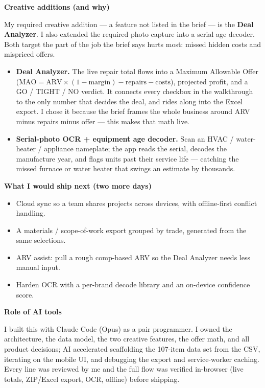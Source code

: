 \documentclass[10pt]{article}
\newcommand{\sechead}[1]{\vspace{3pt}\par{\color{spark}\large\bfseries #1}\par\vspace{1pt}}
\newenvironment{tight}{\begin{itemize}\setlength{\itemsep}{1pt}\setlength{\parskip}{0pt}\setlength{\topsep}{1pt}\setlength{\leftmargin}{1.2em}}{\end{itemize}}
\newcommand{\lead}[1]{\textbf{\color{spark}#1}\;}
\begin{document}
\sechead{Creative additions (and why)}
My required creative addition --- a feature not listed in the brief --- is the
\textbf{Deal Analyzer}. I also extended the required photo capture into a serial age decoder.
Both target the part of the job the brief says hurts most: missed hidden costs and mispriced offers.
\begin{tight}
  \item \lead{Deal Analyzer.} The live repair total flows into a Maximum Allowable Offer
  ($\mathrm{MAO} = \mathrm{ARV}\times(1-\mathrm{margin}) - \mathrm{repairs} - \mathrm{costs}$), projected
  profit, and a GO / TIGHT / NO verdict. It connects every checkbox in the walkthrough to the only
  number that decides the deal, and rides along into the Excel export. I chose it because the brief
  frames the whole business around ARV minus repairs minus offer --- this makes that math live.
  \item \lead{Serial-photo OCR + equipment age decoder.} Scan an HVAC / water-heater / appliance
  nameplate; the app reads the serial, decodes the manufacture year, and flags units past their
  service life --- catching the missed furnace or water heater that swings an estimate by thousands.
\end{tight}

\sechead{What I would ship next (two more days)}
\begin{tight}
  \item Cloud sync so a team shares projects across devices, with offline-first conflict handling.
  \item A materials / scope-of-work export grouped by trade, generated from the same selections.
  \item ARV assist: pull a rough comp-based ARV so the Deal Analyzer needs less manual input.
  \item Harden OCR with a per-brand decode library and an on-device confidence score.
\end{tight}

\sechead{Role of AI tools}
I built this with Claude Code (Opus) as a pair programmer. I owned the architecture, the data model,
the two creative features, the offer math, and all product decisions; AI accelerated scaffolding the
107-item data set from the CSV, iterating on the mobile UI, and debugging the export and
service-worker caching. Every line was reviewed by me and the full flow was verified in-browser
(live totals, ZIP/Excel export, OCR, offline) before shipping.
\end{document}
